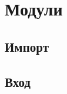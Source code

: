 \hypertarget{modules}{%
\section{Модули}\label{mods:chapter}}

\hypertarget{import}{%
\subsection{Импорт}\label{mods:import}}


\hypertarget{entry}{%
\subsection{Вход}\label{mods:entry}}

